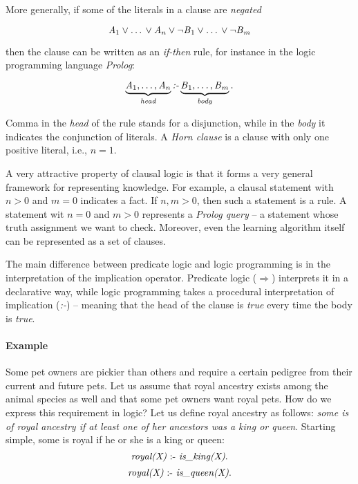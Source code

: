 More generally, if some of the literals in a clause are \textit{negated}

$$ \text{\textit{A}}_1 \vee \text{\ldots} \vee \text{\textit{A}}_n \vee \neg \text{\textit{B}}_1 \vee \text{\textit{\ldots}} \vee \neg \text{\textit{B}}_m$$

then the clause can be written as an \textit{if-then} rule, for instance in the logic programming language \textit{Prolog}:

$$ \underbrace{\text{\textit{A}}_1, \text{\ldots}, \text{\textit{A}}_n}_{\text{\textit{head}}} \text{\textit{:-}} \underbrace{\text{\textit{B}}_1, \text{\textit{\ldots}}, \text{\textit{B}}_m}_{\text{\textit{body}}}.$$

Comma in the \textit{head} of the rule stands for a disjunction, while in the \textit{body} it indicates the conjunction of literals.
A \textit{Horn clause} is a clause with only one positive literal, i.e., $n = 1$.



A very attractive property of clausal logic is that it forms a very general framework for representing knowledge.
For example, a clausal statement with $n > 0$ and $m = 0$ indicates a fact.
If $n, m > 0$, then such a statement is a rule.
A statement wit $n=0$ and $m > 0$ represents a \textit{Prolog query} -- a statement whose truth assignment we want to check.
Moreover, even the learning algorithm itself can be represented as a set of clauses.



The main difference between predicate logic and logic programming is in the interpretation of the implication operator.
Predicate logic ($\Rightarrow$) interprets it in a declarative way, while logic programming takes a procedural interpretation of implication (\textit{:-}) -- meaning that the head of the clause is \textit{true} every time the body is \textit{true}.



\paragraph{Example}
Some pet owners are pickier than others and require a certain pedigree from their current and future pets.
Let us assume that royal ancestry exists among the animal species as well and that some pet owners want royal pets.
How do we express this requirement in logic?
Let us define royal ancestry as follows: \textit{some is of royal ancestry if at least one of her ancestors was a king or queen}.
Starting simple, some is royal if he or she is a king or queen:
$$ \text{\textit{royal(X)}} \text{ :- } \text{\textit{is\_king(X)}}.$$
$$ \text{\textit{royal(X)}} \text{ :- } \text{\textit{is\_queen(X)}}.$$


